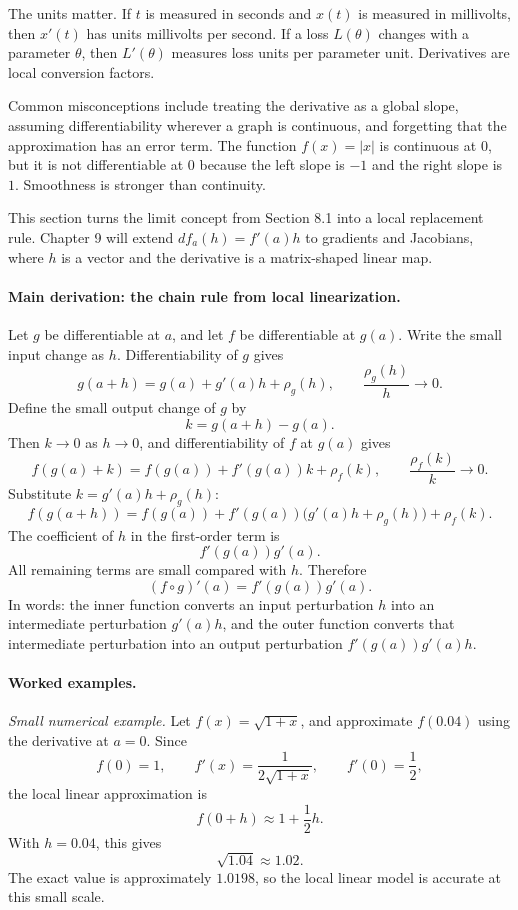 The units matter. If \(t\) is measured in seconds and \(x(t)\) is measured in millivolts, then \(x'(t)\) has units millivolts per second. If a loss \(L(\theta)\) changes with a parameter \(\theta\), then \(L'(\theta)\) measures loss units per parameter unit. Derivatives are local conversion factors.

Common misconceptions include treating the derivative as a global slope, assuming differentiability wherever a graph is continuous, and forgetting that the approximation has an error term. The function \(f(x)=|x|\) is continuous at \(0\), but it is not differentiable at \(0\) because the left slope is \(-1\) and the right slope is \(1\). Smoothness is stronger than continuity.

This section turns the limit concept from Section 8.1 into a local replacement rule. Chapter 9 will extend \(df_a(h)=f'(a)h\) to gradients and Jacobians, where \(h\) is a vector and the derivative is a matrix-shaped linear map.

\paragraph{Main derivation: the chain rule from local linearization.}
Let \(g\) be differentiable at \(a\), and let \(f\) be differentiable at \(g(a)\). Write the small input change as \(h\). Differentiability of \(g\) gives
\[
g(a+h)=g(a)+g'(a)h+\rho_g(h),
\qquad
\frac{\rho_g(h)}{h}\to 0.
\]
Define the small output change of \(g\) by
\[
k=g(a+h)-g(a).
\]
Then \(k\to 0\) as \(h\to 0\), and differentiability of \(f\) at \(g(a)\) gives
\[
f(g(a)+k)=f(g(a))+f'(g(a))k+\rho_f(k),
\qquad
\frac{\rho_f(k)}{k}\to 0.
\]
Substitute \(k=g'(a)h+\rho_g(h)\):
\[
f(g(a+h))
=f(g(a))+f'(g(a))\bigl(g'(a)h+\rho_g(h)\bigr)+\rho_f(k).
\]
The coefficient of \(h\) in the first-order term is
\[
f'(g(a))g'(a).
\]
All remaining terms are small compared with \(h\). Therefore
\[
(f\circ g)'(a)=f'(g(a))g'(a).
\]
In words: the inner function converts an input perturbation \(h\) into an intermediate perturbation \(g'(a)h\), and the outer function converts that intermediate perturbation into an output perturbation \(f'(g(a))g'(a)h\).

\paragraph{Worked examples.}
\emph{Small numerical example.} Let \(f(x)=\sqrt{1+x}\), and approximate \(f(0.04)\) using the derivative at \(a=0\). Since
\[
f(0)=1,
\qquad
f'(x)=\frac{1}{2\sqrt{1+x}},
\qquad
f'(0)=\frac12,
\]
the local linear approximation is
\[
f(0+h)\approx 1+\frac12 h.
\]
With \(h=0.04\), this gives
\[
\sqrt{1.04}\approx 1.02.
\]
The exact value is approximately \(1.0198\), so the local linear model is accurate at this small scale.

